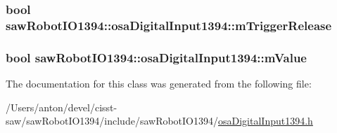 \subsubsection[{m\+Trigger\+Release}]{\setlength{\rightskip}{0pt plus 5cm}bool saw\+Robot\+I\+O1394\+::osa\+Digital\+Input1394\+::m\+Trigger\+Release\hspace{0.3cm}{\ttfamily [protected]}}\label{classsaw_robot_i_o1394_1_1osa_digital_input1394_ae392f805d438b0d03b980146e9b53708}
\hypertarget{classsaw_robot_i_o1394_1_1osa_digital_input1394_af6b92673c21b3119f9ecbcb48d37e82a}{}
\subsubsection[{m\+Value}]{\setlength{\rightskip}{0pt plus 5cm}bool saw\+Robot\+I\+O1394\+::osa\+Digital\+Input1394\+::m\+Value\hspace{0.3cm}{\ttfamily [protected]}}\label{classsaw_robot_i_o1394_1_1osa_digital_input1394_af6b92673c21b3119f9ecbcb48d37e82a}


The documentation for this class was generated from the following file\+:\begin{DoxyCompactItemize}
\item 
/\+Users/anton/devel/cisst-\/saw/saw\+Robot\+I\+O1394/include/saw\+Robot\+I\+O1394/\hyperlink{osa_digital_input1394_8h}{osa\+Digital\+Input1394.\+h}\end{DoxyCompactItemize}
